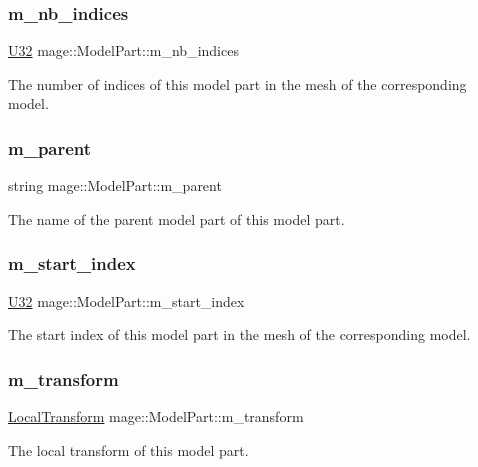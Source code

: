 \subsubsection{\texorpdfstring{m\+\_\+nb\+\_\+indices}{m\_nb\_indices}}
{\footnotesize\ttfamily \hyperlink{namespacemage_a41c104c036fba3756a74e19f793eeaa1}{U32} mage\+::\+Model\+Part\+::m\+\_\+nb\+\_\+indices}

The number of indices of this model part in the mesh of the corresponding model. \hypertarget{structmage_1_1_model_part_ad4754bbb69d28885c09cef591d4d96c5}{}\label{structmage_1_1_model_part_ad4754bbb69d28885c09cef591d4d96c5} 
\subsubsection{\texorpdfstring{m\+\_\+parent}{m\_parent}}
{\footnotesize\ttfamily string mage\+::\+Model\+Part\+::m\+\_\+parent}

The name of the parent model part of this model part. \hypertarget{structmage_1_1_model_part_a3151ca6c89bad26bc454aca693be97c4}{}\label{structmage_1_1_model_part_a3151ca6c89bad26bc454aca693be97c4} 
\subsubsection{\texorpdfstring{m\+\_\+start\+\_\+index}{m\_start\_index}}
{\footnotesize\ttfamily \hyperlink{namespacemage_a41c104c036fba3756a74e19f793eeaa1}{U32} mage\+::\+Model\+Part\+::m\+\_\+start\+\_\+index}

The start index of this model part in the mesh of the corresponding model. \hypertarget{structmage_1_1_model_part_a557a14038880ca6ba6d4ce7a8d81b774}{}\label{structmage_1_1_model_part_a557a14038880ca6ba6d4ce7a8d81b774} 
\subsubsection{\texorpdfstring{m\+\_\+transform}{m\_transform}}
{\footnotesize\ttfamily \hyperlink{classmage_1_1_local_transform}{Local\+Transform} mage\+::\+Model\+Part\+::m\+\_\+transform}

The local transform of this model part. 